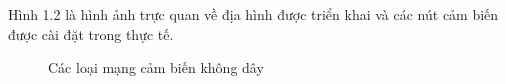 Hình 1.2 là hình ảnh trực quan về địa hình được triển khai và các nút cảm biến được cài đặt trong thực tế.
\linebreak 
\begin{figure}[htb]
	\caption{\label{fig:my-label} Các loại mạng cảm biến không dây}
\end{figure}

